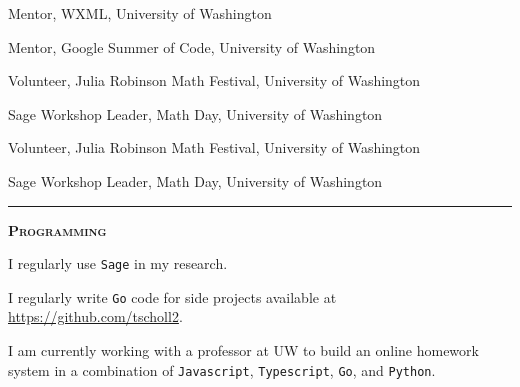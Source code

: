 \documentclass[12pt]{article}
\newcommand{\sectionheading}[1]
{
\bigskip %
\noindent
\hspace{-6.5mm}\textcolor{Gray}{\rule[.75mm]{21.5mm}{1mm}} %
\hspace{.2mm}	%
{\large{\textbf{\textsc{#1}}}} %
}
\newenvironment{date_section}
	{
	\vspace{-1ex}
	\leftmargini = 15ex
		\begin{itemize}[
			labelsep = *,
			labelwidth = 9ex,
			labelindent = 0ex,
			itemindent = !,
			font=\normalfont,
			align=parleft
		]{}
		\itemsep=-1.5mm
	}
	{\end{itemize}\vspace{-2ex}}
\newcommand{\yearmo}[2]{
	\item[
		{\makebox[1ex][r]{#1}}
		\hspace{1ex}
		{\makebox[1ex][l]{#2} }
		] }
\newcommand{\yearrange}[2]{
	\item[
		{\makebox[1ex][r]{#1}}
		--
		{\makebox[1ex][l]{#2} }
		] }
\begin{document}
		\begin{date_section}
			
			\yearrange{2016}{2017} %
				Mentor,
				WXML,
				University of Washington

			\yearmo{2016}{} %
				Mentor,
				Google Summer of Code,
				University of Washington

			\yearmo{2016}{} %
				Volunteer,
				Julia Robinson Math Festival,
				University of Washington
			
			\yearmo{2016}{} %
				Sage Workshop Leader,
				Math Day,
				University of Washington

			\yearmo{2015}{}
				Volunteer,
				Julia Robinson Math Festival,
				University of Washington

			\yearmo{2015}{}
				Sage Workshop Leader,
				Math Day,
				University of Washington



		\end{date_section}


	\sectionheading{Programming}%
	
        \vspace{1ex}
        
        \noindent I regularly use {\tt Sage} in my research.
       

		\noindent I regularly write {\tt Go} code for side projects available at \url{https://github.com/tscholl2}.

		\noindent I am currently working with a professor at UW to build an online homework system in a combination of {\tt Javascript}, {\tt Typescript}, {\tt Go}, and {\tt Python}.

\end{document}
